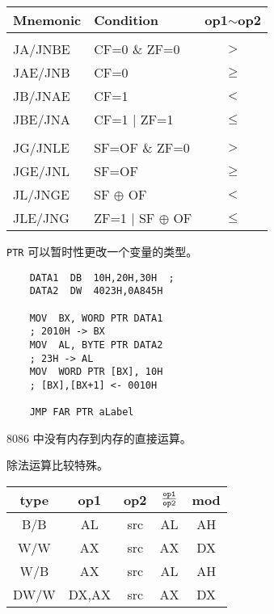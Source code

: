 \begin{table*}
\begin{minipage}{0.4\textwidth}
		\begin{tabular}{|>{\ttfamily}l|>{\ttfamily}l|c|}
			\hline
			Mnemonic & Condition & op1$\sim$op2 \\
			\hline
			\multicolumn{3}{|c|}{Unsigned} \\
			\hline
			JA/JNBE & CF=0 \& ZF=0 & $>$ \\
			JAE/JNB & CF=0 & $\geq$ \\
			JB/JNAE & CF=1 & $<$\\
			JBE/JNA & CF=1 | ZF=1 & $\leq$ \\
			\hline
			\multicolumn{3}{|c|}{Signed} \\
			\hline
			JG/JNLE & SF=OF \& ZF=0 & $>$ \\
			JGE/JNL & SF=OF &$\geq$ \\
			JL/JNGE & SF $\oplus$ OF & $<$\\
			JLE/JNG & ZF=1 | SF $\oplus$ OF & $\leq$ \\
			\hline
		\end{tabular}
	\end{minipage}
\end{table*}

\texttt{PTR} 可以暂时性更改一个变量的类型。
\begin{verbatim}
	DATA1  DB  10H,20H,30H  ;  
	DATA2  DW  4023H,0A845H 

	MOV  BX, WORD PTR DATA1	
	; 2010H -> BX
	MOV  AL, BYTE PTR DATA2	
	; 23H -> AL 
	MOV  WORD PTR [BX], 10H 
	; [BX],[BX+1] <- 0010H
	
	JMP FAR PTR aLabel
\end{verbatim}

8086 中没有内存到内存的直接运算。

除法运算比较特殊。

\begin{table}[H]
\begin{tabular}{|c|>{\ttfamily}c|>{\ttfamily}c|>{\ttfamily}c|>{\ttfamily}c|}
	\hline
	type & op1 & op2 & $\frac{\tt op1}{\tt op2}$ & mod \\
	\hline
	B/B & AL & src & AL & AH \\
	\hline
	W/W & AX & src & AX & DX \\
	\hline
	W/B & AX & src & AL & AH \\
	\hline
	DW/W & DX,AX & src & AX & DX \\
	\hline
\end{tabular}
\end{table}

